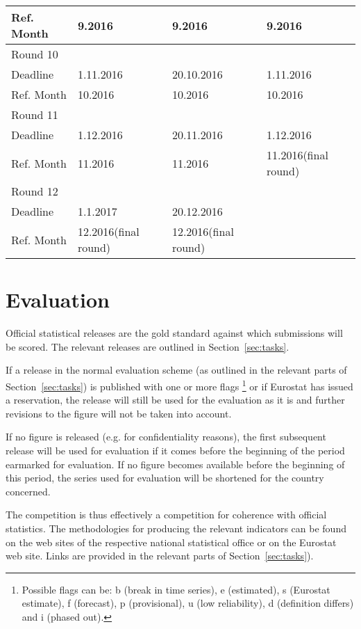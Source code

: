 \documentclass[12pt]{article}
\begin{document}
\begin{longtable}{ | p{3cm} | p{3cm}| p{3cm}| p{3cm}| }
Ref. Month& 9.2016 & 9.2016 & 9.2016 \\
\hline
Round 10&  & &  \\
Deadline  & 1.11.2016 & 20.10.2016 & 1.11.2016 \\
Ref. Month& 10.2016 & 10.2016 & 10.2016 \\
\hline
Round 11&  & &  \\
Deadline  & 1.12.2016 & 20.11.2016 & 1.12.2016 \\
Ref. Month& 11.2016 & 11.2016 & 11.2016\newline (final round) \\
\hline
Round 12&  & &  \\
Deadline  & 1.1.2017 & 20.12.2016 &  \\
Ref. Month& 12.2016\newline (final round) & 12.2016\newline (final round) &  \\
\hline
\end{longtable}

\newpage
\section{Evaluation}
\label{sec:eval}
Official statistical releases are the gold standard against which submissions will be scored. The relevant releases are outlined in Section~\ref{sec:tasks}.

If a release in the normal evaluation scheme (as outlined in the relevant parts of Section~\ref{sec:tasks}) is published with one or more flags \footnote{Possible flags can be: b (break in time series), e (estimated), s (Eurostat estimate), f (forecast), p (provisional), u (low reliability), d (definition differs) and i (phased out).} or if Eurostat has issued a reservation, the release will still be used for the evaluation as it is and further revisions to the figure will not be taken into account. 

If no figure is released (e.g. for confidentiality reasons), the first subsequent release will be used for evaluation if it comes before the beginning of the period earmarked for evaluation. If no figure becomes available before the beginning of this period, the series used for evaluation will be shortened for the country concerned.

The competition is thus effectively a competition for coherence with official statistics. The methodologies for producing the relevant indicators can be found on the web sites of the respective national statistical office or on the Eurostat web site. Links are provided in the relevant parts of Section~\ref{sec:tasks}).
\end{document}
